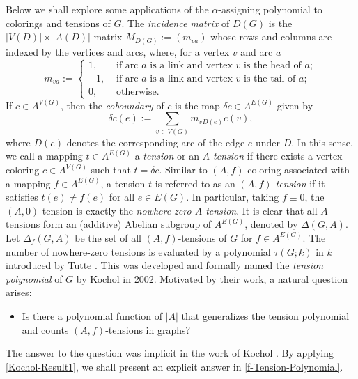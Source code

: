 \documentclass[12pt]{article}%
\numberwithin{equation}{section}
\begin{document}
Below we shall explore some applications of the $\alpha$-assigning polynomial to colorings and tensions of $G$. The {\em incidence matrix} of $D(G)$ is the $|V(D)|\times |A(D)|$ matrix $M_{D(G)}:=(m_{va})$ whose rows and columns are indexed by the vertices and arcs, where, for a vertex $v$ and arc $a$
\[
m_{va}:=\begin{cases}
1, & \text{ if arc } a \text{ is a link and vertex } v \text{ is the head of } a;\\
-1,& \text{ if arc } a \text{ is a link and vertex } v \text{ is the tail of } a;\\
0,& \text{ otherwise}.
\end{cases}
\]
If $c\in A^{V(G)}$, then the {\em coboundary} of $c$ is the map $\delta c\in A^{E(G)}$ given by 
\[
\delta c(e):=\sum_{v\in V(G)}m_{vD(e)}c(v),
\]
where $D(e)$ denotes the corresponding arc of the edge $e$ under $D$. In this sense, we call a mapping $t\in A^{E(G)}$ a {\em tension} or an {\em$A$-tension} if there exists a vertex coloring  $c\in  A^{V(G)}$ such that $t=\delta c$. Similar to $(A,f)$-coloring associated with a mapping $f\in A^{E(G)}$, a tension $t$ is referred to as an {\em$(A,f)$-tension} if it satisfies $t(e)\ne f(e)$ for all $e\in E(G)$. In particular, taking $f\equiv0$, the $(A,0)$-tension is exactly the {\em nowhere-zero $A$-tension}. It is clear that all $A$-tensions form an (additive) Abelian subgroup of $A^{E(G)}$, denoted by $\Delta(G,A)$.   Let $\Delta_f(G,A)$ be the set of all $(A,f)$-tensions of $G$ for $f\in A^{E(G)}$. The number of nowhere-zero tensions is evaluated by a polynomial $\tau(G;k)$ in $k$ introduced by Tutte \cite{Tutte1954}. This was developed and  formally named the {\em tension polynomial} of $G$ by Kochol \cite{Kochol2002} in  2002. Motivated by their work, a natural question arises:
\begin{itemize}
\item Is there a polynomial function of $|A|$ that generalizes the tension polynomial and counts $(A,f)$-tensions in graphs?
\end{itemize}
The answer to the question was implicit in the work of Kochol \cite{Kochol2024}. By applying \autoref{Kochol-Result1},  we shall present an explicit answer in \autoref{f-Tension-Polynomial}.
\end{document}
